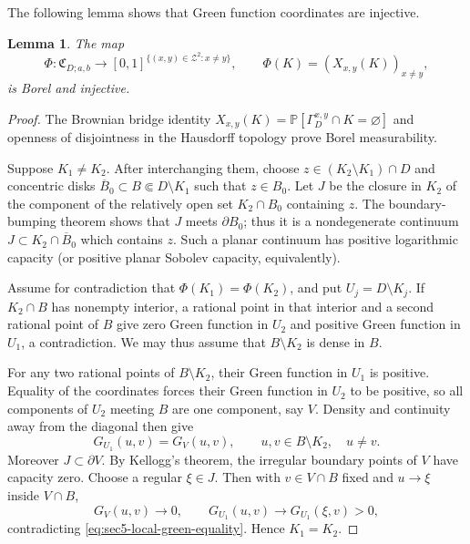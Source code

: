 \documentclass[11pt]{article}
\numberwithin{equation}{section}
\newcommand{\1}{\mathbf{1}}
\newtheorem{lemma}[theorem]{Lemma}
\newcommand\ol[1]{\overline{#1}}
\newcommand{\Prob}{\mathbb P}
\begin{document}
The following lemma shows that Green function coordinates are injective.
\begin{lemma}
\label{lem:sec5-green-injective}
The map
\[
 \Phi:\mathfrak C_{D;a,b}\longrightarrow
 [0,1]^{\{(x,y)\in\mathcal Z^2:x\ne y\}},
 \qquad \Phi(K)=(X_{x,y}(K))_{x\ne y},
\]
is Borel and injective.
\end{lemma}

\begin{proof}
The Brownian bridge identity $X_{x,y}(K)=\Prob[\Gamma_D^{x,y}\cap K=\varnothing]$ and openness of disjointness in the Hausdorff topology prove
Borel measurability.

Suppose \(K_1\ne K_2\).  After interchanging them, choose
\(z\in(K_2\setminus K_1)\cap D\) and concentric disks $\ol B_0\subset B\Subset D\setminus K_1$ such that $z\in B_0$.
Let \(J\) be the closure in \(K_2\) of the component of the relatively
open set \(K_2\cap B_0\) containing \(z\).  The boundary-bumping theorem
\cite[Theorem~5.4]{Nadler1992} shows that \(J\) meets \(\partial B_0\);
thus it is a nondegenerate continuum $J\subset K_2\cap\ol B_0$
which contains \(z\).  Such a planar continuum
has positive logarithmic capacity (or positive planar Sobolev capacity, equivalently).

Assume for contradiction that \(\Phi(K_1)=\Phi(K_2)\), and put
\(U_j=D\setminus K_j\).  If \(K_2\cap B\) has nonempty interior, a
rational point in that interior and a second rational point of \(B\) give
zero Green function in \(U_2\) and positive Green function in \(U_1\), a
contradiction.  We may thus assume that \(B\setminus K_2\) is dense in \(B\).

For any two rational points of \(B\setminus K_2\), their Green
function in \(U_1\) is positive.  Equality of the coordinates forces their Green function in \(U_2\) to be positive, so all components of \(U_2\) meeting
\(B\) are one component, say \(V\).  Density and continuity away from the
diagonal then give
\begin{equation}\label{eq:sec5-local-green-equality}
 G_{U_1}(u,v)=G_V(u,v),
 \qquad u,v\in B\setminus K_2,\quad u\ne v.
\end{equation}
Moreover \(J\subset\partial V\).  By Kellogg's theorem, the irregular
boundary points of \(V\) have capacity zero. Choose a regular
\(\xi\in J\). Then with \(v\in V\cap B\) fixed and \(u\to\xi\) inside
\(V\cap B\),
\[
 G_V(u,v)\longrightarrow0,\qquad
 G_{U_1}(u,v)\longrightarrow G_{U_1}(\xi,v)>0,
\]
contradicting \eqref{eq:sec5-local-green-equality}. Hence \(K_1=K_2\).
\end{proof}
\end{document}

